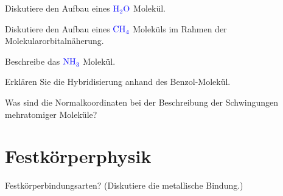 \documentclass[a5paper,12pt,ngerman,print,grid=front]{kartei}
\let\oldce\ce
\renewcommand*{\ce}[1]{\begingroup\color{blue}\oldce{#1}\endgroup}
\begin{document}
	\begin{karte}{
		Diskutiere den Aufbau eines $\ce{H2O}$ Molekül.
		}
		
		
		
	\end{karte}


	\begin{karte}{
		Diskutiere den Aufbau eines $\ce{CH4}$ Moleküls im Rahmen der Molekularorbitalnäherung.
		}
		
		
		
	\end{karte}


	\begin{karte}{
		Beschreibe das $\ce{NH3}$ Molekül.
		}
		
		
		
	\end{karte}


	\begin{karte}{
		Erklären Sie die Hybridisierung anhand des Benzol-Molekül.
		}
		
		
		
	\end{karte}


	\begin{karte}{
		Was sind die Normalkoordinaten bei der Beschreibung der Schwingungen mehratomiger Moleküle?
		}
		
		
		
	\end{karte}




\section*{Festkörperphysik}



	\begin{karte}{
		Festkörperbindungsarten? (Diskutiere die metallische Bindung.)
		}
		
		
		
	\end{karte}
\end{document}
